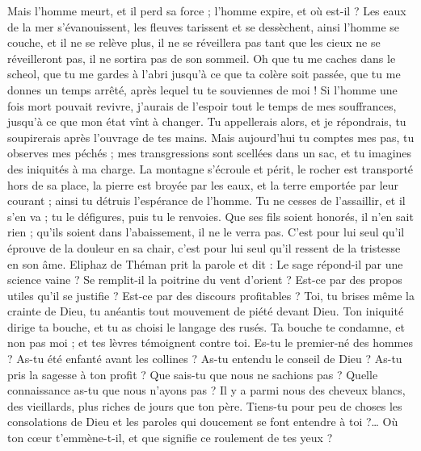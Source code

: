 \begin{multicols}{2}
Mais l'homme meurt, et il perd sa force ; l'homme expire, et où est-il ?
Les eaux de la mer s'évanouissent, les fleuves tarissent et se dessèchent,
ainsi l'homme se couche, et il ne se relève plus, il ne se réveillera pas tant que les cieux ne se réveilleront pas, il ne sortira pas de son sommeil.
Oh que tu me caches dans le scheol, que tu me gardes à l'abri jusqu'à ce que ta colère soit passée, que tu me donnes un temps arrêté, après lequel tu te souviennes de moi !
Si l'homme une fois mort pouvait revivre, j'aurais de l'espoir tout le temps de mes souffrances, jusqu'à ce que mon état vînt à changer.
Tu appellerais alors, et je répondrais, tu soupirerais après l'ouvrage de tes mains.
Mais aujourd'hui tu comptes mes pas, tu observes mes péchés ;
mes transgressions sont scellées dans un sac, et tu imagines des iniquités à ma charge.
La montagne s'écroule et périt, le rocher est transporté hors de sa place,
la pierre est broyée par les eaux, et la terre emportée par leur courant ; ainsi tu détruis l'espérance de l'homme.
Tu ne cesses de l'assaillir, et il s'en va ; tu le défigures, puis tu le renvoies.
Que ses fils soient honorés, il n'en sait rien ; qu'ils soient dans l'abaissement, il ne le verra pas.
C'est pour lui seul qu'il éprouve de la douleur en sa chair, c'est pour lui seul qu'il ressent de la tristesse en son âme.
\VerseOne{}Eliphaz de Théman prit la parole et dit :
Le sage répond-il par une science vaine ? Se remplit-il la poitrine du vent d'orient ?
Est-ce par des propos utiles qu'il se justifie ? Est-ce par des discours profitables ?
Toi, tu brises même la crainte de Dieu, tu anéantis tout mouvement de piété devant Dieu.
Ton iniquité dirige ta bouche, et tu as choisi le langage des rusés.
Ta bouche te condamne, et non pas moi ; et tes lèvres témoignent contre toi.
Es-tu le premier-né des hommes ? As-tu été enfanté avant les collines ?
As-tu entendu le conseil de Dieu ? As-tu pris la sagesse à ton profit ?
Que sais-tu que nous ne sachions pas ? Quelle connaissance as-tu que nous n'ayons pas ?
Il y a parmi nous des cheveux blancs, des vieillards, plus riches de jours que ton père.
Tiens-tu pour peu de choses les consolations de Dieu et les paroles qui doucement se font entendre à toi ?…
Où ton cœur t'emmène-t-il, et que signifie ce roulement de tes yeux ?

\end{multicols}
